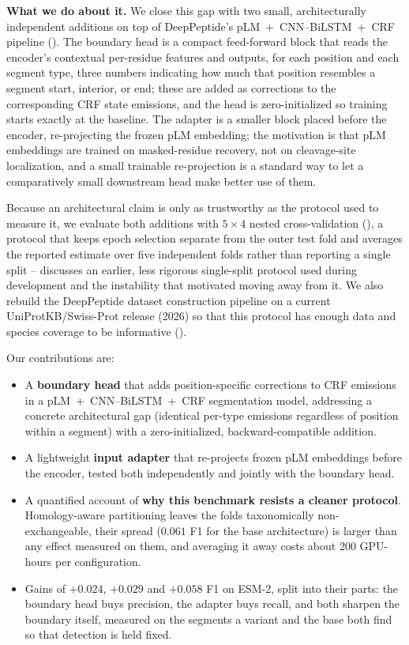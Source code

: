 \documentclass{article}
\begin{document}
\textbf{What we do about it.} We close this gap with two small, architecturally independent additions on top of DeepPeptide's pLM~+~CNN--BiLSTM~+~CRF pipeline (). The boundary head is a compact feed-forward block that reads the encoder's contextual per-residue features and outputs, for each position and each segment type, three numbers indicating how much that position resembles a segment start, interior, or end; these are added as corrections to the corresponding CRF state emissions, and the head is zero-initialized so training starts exactly at the baseline. The adapter is a smaller block placed before the encoder, re-projecting the frozen pLM embedding; the motivation is that pLM embeddings are trained on masked-residue recovery, not on cleavage-site localization, and a small trainable re-projection is a standard way to let a comparatively small downstream head make better use of them.

Because an architectural claim is only as trustworthy as the protocol used to measure it, we evaluate both additions with $5\times4$ nested cross-validation (), a protocol that keeps epoch selection separate from the outer test fold and averages the reported estimate over five independent folds rather than reporting a single split --  discusses an earlier, less rigorous single-split protocol used during development and the instability that motivated moving away from it. We also rebuild the DeepPeptide dataset construction pipeline on a current UniProtKB/Swiss-Prot release (2026) so that this protocol has enough data and species coverage to be informative ().

Our contributions are:
\begin{itemize}
  \item A \textbf{boundary head} that adds position-specific corrections to CRF emissions in a pLM~+~CNN--BiLSTM~+~CRF segmentation model, addressing a concrete architectural gap (identical per-type emissions regardless of position within a segment) with a zero-initialized, backward-compatible addition.
  \item A lightweight \textbf{input adapter} that re-projects frozen pLM embeddings before the encoder, tested both independently and jointly with the boundary head.
  \item A quantified account of \textbf{why this benchmark resists a cleaner protocol}. Homology-aware partitioning leaves the folds taxonomically non-exchangeable, their spread ($0.061$ F1 for the base architecture) is larger than any effect measured on them, and averaging it away costs about 200 GPU-hours per configuration.
  \item Gains of $+0.024$, $+0.029$ and $+0.058$ F1 on ESM-2, split into their parts: the boundary head buys precision, the adapter buys recall, and both sharpen the boundary itself, measured on the segments a variant and the base both find so that detection is held fixed.
\end{itemize}
\end{document}
